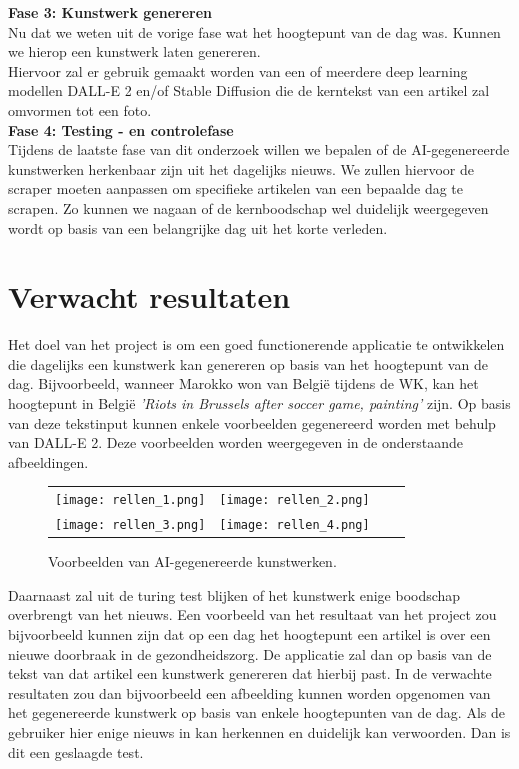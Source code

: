 \noindent
\textbf{Fase 3: Kunstwerk genereren} \\
Nu dat we weten uit de vorige fase wat het hoogtepunt van de dag was. Kunnen we hierop een kunstwerk laten genereren. \\
Hiervoor zal er gebruik gemaakt worden van een of meerdere deep learning modellen DALL-E 2 en/of Stable Diffusion die de kerntekst van een artikel zal omvormen tot een foto. \\

\noindent
\textbf{Fase 4: Testing - en controlefase} \\ 
Tijdens de laatste fase van dit onderzoek willen we bepalen of de AI-gegenereerde kunstwerken herkenbaar zijn uit het dagelijks nieuws. We zullen hiervoor de scraper moeten aanpassen om specifieke artikelen van een bepaalde dag te scrapen. Zo kunnen we nagaan of de kernboodschap wel duidelijk weergegeven wordt op basis van een belangrijke dag uit het korte verleden.
\section{Verwacht resultaten}%
\label{sec:verwachte_resultaten}
Het doel van het project is om een goed functionerende applicatie te ontwikkelen die dagelijks een kunstwerk kan genereren op basis van het hoogtepunt van de dag. Bijvoorbeeld, wanneer Marokko won van België tijdens de WK, kan het hoogtepunt in België \emph{'Riots in Brussels after soccer game, painting'} zijn. Op basis van deze tekstinput kunnen enkele voorbeelden gegenereerd worden met behulp van DALL-E 2. Deze voorbeelden worden weergegeven in de onderstaande afbeeldingen.


\begin{figure}[h!]
    \centering
    \begin{tabular}{llll}
        \texttt{[image: rellen\_1.png]} &
        \texttt{[image: rellen\_2.png]} \\
        \texttt{[image: rellen\_3.png]} &
        \texttt{[image: rellen\_4.png]}
    \end{tabular}
    \caption{Voorbeelden van AI-gegenereerde kunstwerken.}
    \label{fig:examples}
\end{figure}
\noindent
Daarnaast zal uit de turing test blijken of het kunstwerk enige boodschap overbrengt van het nieuws.
\noindent
Een voorbeeld van het resultaat van het project zou bijvoorbeeld kunnen zijn dat op een dag het hoogtepunt een artikel is over een nieuwe doorbraak in de gezondheidszorg. De applicatie zal dan op basis van de tekst van dat artikel een kunstwerk genereren dat hierbij past. In de verwachte resultaten zou dan bijvoorbeeld een afbeelding kunnen worden opgenomen van het gegenereerde kunstwerk op basis van enkele hoogtepunten van de dag. Als de gebruiker hier enige nieuws in kan herkennen en duidelijk kan verwoorden. Dan is dit een geslaagde test. 

